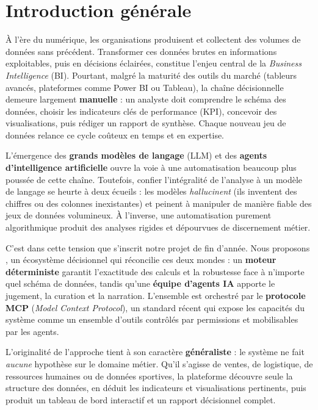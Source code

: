 \chapter*{Introduction générale}

À l'ère du numérique, les organisations produisent et collectent des volumes
de données sans précédent. Transformer ces données brutes en informations
exploitables, puis en décisions éclairées, constitue l'enjeu central de la
\textit{Business Intelligence} (BI). Pourtant, malgré la maturité des outils
du marché (tableurs avancés, plateformes comme Power BI ou Tableau), la
chaîne décisionnelle demeure largement \textbf{manuelle} : un analyste doit
comprendre le schéma des données, choisir les indicateurs clés de performance
(KPI), concevoir des visualisations, puis rédiger un rapport de synthèse.
Chaque nouveau jeu de données relance ce cycle coûteux en temps et en
expertise.

L'émergence des \textbf{grands modèles de langage} (LLM) et des
\textbf{agents d'intelligence artificielle} ouvre la voie à une automatisation
beaucoup plus poussée de cette chaîne. Toutefois, confier l'intégralité de
l'analyse à un modèle de langage se heurte à deux écueils : les modèles
\emph{hallucinent} (ils inventent des chiffres ou des colonnes inexistantes)
et peinent à manipuler de manière fiable des jeux de données volumineux. À
l'inverse, une automatisation purement algorithmique produit des analyses
rigides et dépourvues de discernement métier.

C'est dans cette tension que s'inscrit notre projet de fin d'année. Nous
proposons \textbf{\montitre}, un écosystème décisionnel qui réconcilie ces
deux mondes : un \textbf{moteur déterministe} garantit l'exactitude des
calculs et la robustesse face à n'importe quel schéma de données, tandis
qu'une \textbf{équipe d'agents IA} apporte le jugement, la curation et la
narration. L'ensemble est orchestré par le \textbf{protocole MCP}
(\textit{Model Context Protocol}), un standard récent qui expose les
capacités du système comme un ensemble d'outils contrôlés par permissions et
mobilisables par les agents.

L'originalité de l'approche tient à son caractère \textbf{généraliste} : le
système ne fait \emph{aucune} hypothèse sur le domaine métier. Qu'il s'agisse
de ventes, de logistique, de ressources humaines ou de données sportives, la
plateforme découvre seule la structure des données, en déduit les indicateurs
et visualisations pertinents, puis produit un tableau de bord interactif et un
rapport décisionnel complet.

